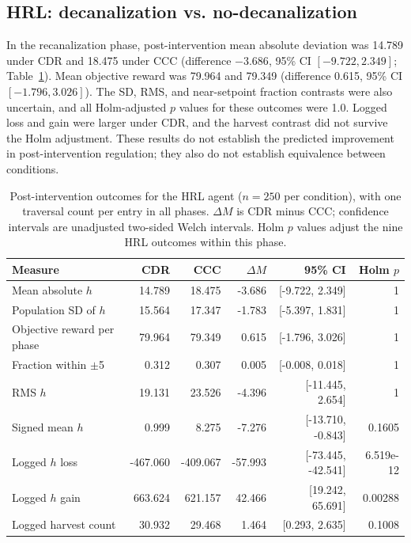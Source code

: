 \documentclass[12pt,fleqn]{article}
\begin{document}
\subsection{HRL: decanalization vs. no-decanalization}

In the recanalization phase, post-intervention mean absolute deviation was 14.789 under CDR and 18.475 under CCC (difference $-3.686$, 95\% CI $[-9.722, 2.349]$; Table~\ref{model-analysis-hrl}). Mean objective reward was 79.964 and 79.349 (difference 0.615, 95\% CI $[-1.796, 3.026]$). The SD, RMS, and near-setpoint fraction contrasts were also uncertain, and all Holm-adjusted $p$ values for these outcomes were 1.0. Logged loss and gain were larger under CDR, and the harvest contrast did not survive the Holm adjustment. These results do not establish the predicted improvement in post-intervention regulation; they also do not establish equivalence between conditions.

\begin{table}[htbp]
\centering\scriptsize
\setlength{\tabcolsep}{3pt}
\begin{tabular}{@{}lrrrrr@{}}
\toprule
Measure & CDR & CCC & $\Delta M$ & 95\% CI & Holm $p$\\
\midrule
Mean absolute $h$ & 14.789 & 18.475 & -3.686 & [-9.722, 2.349] & 1 \\
Population SD of $h$ & 15.564 & 17.347 & -1.783 & [-5.397, 1.831] & 1 \\
Objective reward per phase & 79.964 & 79.349 & 0.615 & [-1.796, 3.026] & 1 \\
Fraction within $\pm$5 & 0.312 & 0.307 & 0.005 & [-0.008, 0.018] & 1 \\
RMS $h$ & 19.131 & 23.526 & -4.396 & [-11.445, 2.654] & 1 \\
Signed mean $h$ & 0.999 & 8.275 & -7.276 & [-13.710, -0.843] & 0.1605 \\
Logged $h$ loss & -467.060 & -409.067 & -57.993 & [-73.445, -42.541] & 6.519e-12 \\
Logged $h$ gain & 663.624 & 621.157 & 42.466 & [19.242, 65.691] & 0.00288 \\
Logged harvest count & 30.932 & 29.468 & 1.464 & [0.293, 2.635] & 0.1008 \\
\bottomrule
\end{tabular}
\caption{Post-intervention outcomes for the HRL agent ($n=250$ per condition), with one traversal count per entry in all phases. $\Delta M$ is CDR minus CCC; confidence intervals are unadjusted two-sided Welch intervals. Holm $p$ values adjust the nine HRL outcomes within this phase.}
\label{model-analysis-hrl}
\end{table}
\end{document}
